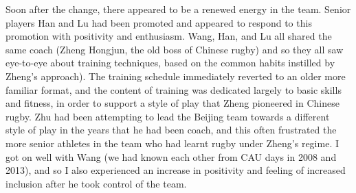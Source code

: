 \begin{CJK}{UTF8}{gbsn}
Soon after the change, there appeared to be a renewed energy in the team.  Senior players Han and Lu had been promoted and appeared to respond to this promotion with positivity and enthusiasm.  Wang, Han, and Lu all shared the same coach (Zheng Hongjun, the old boss of Chinese rugby) and so they all saw eye-to-eye about training techniques, based on the common habits instilled by Zheng's approach).  The training schedule immediately reverted to an older more familiar format, and the content of training was dedicated largely to basic skills and fitness, in order to support a style of play that Zheng pioneered in Chinese rugby.  Zhu had been attempting to lead the Beijing team towards a different style of play in the years that he had been coach, and this often frustrated the more senior athletes in the team who had learnt rugby under Zheng's regime.  I got on well with Wang (we had known each other from CAU days in 2008 and 2013), and so I also experienced an increase in positivity and feeling of increased inclusion after he took control of the team.


\section{}




                                                          \end{CJK}

